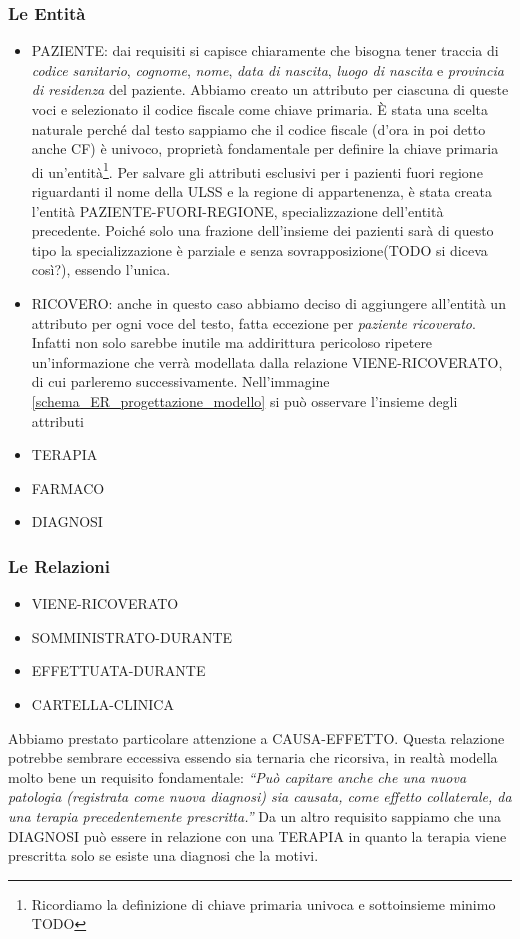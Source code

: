 \documentclass{article}
\begin{document}
\subsubsection{Le Entità} %
\begin{itemize}
\item PAZIENTE: dai requisiti si capisce chiaramente che bisogna tener traccia di \textit{codice sanitario}, \textit{cognome}, \textit{nome}, \textit{data di nascita}, \textit{luogo di nascita} e \textit{provincia di residenza} del paziente.
    Abbiamo creato un attributo per ciascuna di queste voci e selezionato il codice fiscale come chiave primaria.
    È stata una scelta naturale perché dal testo sappiamo che il codice fiscale (d'ora in poi detto anche CF) è univoco, proprietà fondamentale per definire la chiave primaria di un'entità\footnote{Ricordiamo la definizione di chiave primaria univoca e sottoinsieme minimo TODO}.
    Per salvare gli attributi esclusivi per i pazienti fuori regione riguardanti il nome della ULSS e la regione di appartenenza, è stata creata l'entità PAZIENTE-FUORI-REGIONE, specializzazione dell'entità precedente.
    Poiché solo una frazione dell'insieme dei pazienti sarà di questo tipo la specializzazione è parziale e senza sovrapposizione(TODO si diceva così?), essendo l'unica.
  \item RICOVERO: anche in questo caso abbiamo deciso di aggiungere all'entità un attributo per ogni voce del testo, fatta eccezione per \textit{paziente ricoverato}.
    Infatti non solo sarebbe inutile ma addirittura pericoloso ripetere un'informazione che verrà modellata dalla relazione VIENE-RICOVERATO, di cui parleremo successivamente.
    Nell'immagine \ref{schema_ER_progettazione_modello} si può osservare l'insieme degli attributi 
  \item TERAPIA
  \item FARMACO
  \item DIAGNOSI
\end{itemize}

\subsubsection{Le Relazioni}
\begin{itemize}
  \item VIENE-RICOVERATO
  \item SOMMINISTRATO-DURANTE
  \item EFFETTUATA-DURANTE
  \item CARTELLA-CLINICA
\end{itemize}
Abbiamo prestato particolare attenzione a CAUSA-EFFETTO.
Questa relazione potrebbe sembrare eccessiva essendo sia ternaria che ricorsiva, in realtà modella molto bene un requisito fondamentale: \textit{``Può capitare anche che una nuova patologia (registrata come nuova diagnosi) sia causata, come effetto collaterale, da una terapia precedentemente prescritta.''}
Da un altro requisito sappiamo che una DIAGNOSI può essere in relazione con una TERAPIA in quanto la terapia viene prescritta solo se esiste una diagnosi che la motivi.
\end{document}
